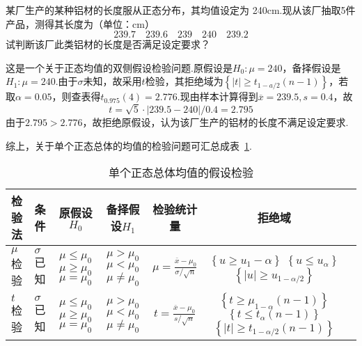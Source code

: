 \begin{example}\label{exam7.2.2}
	某厂生产的某种铝材的长度服从正态分布，其均值设定为 240cm.现从该厂抽取5件产品，测得其长度为（单位：cm）
	\[239.7 \quad 239.6 \quad 239 \quad 240 \quad 239.2\]
	试判断该厂此类铝材的长度是否满足设定要求？
	
	这是一个关于正态均值的双侧假设检验问题.原假设是$H_{0}:\mu =240$，备择假设是$H_{1}:\mu =240$.由于$\sigma$未知，故采用$t$检验，其拒绝域为$\left\{\left| t\right|\geq t_{1-a/2}\left(n-1\right)\right\}$，若取$\alpha=0.05$，则查表得$t_{0.975}(4)=2.776$.现由样本计算得到$\overline{ x }=239.5,s=0.4$，故
	\[t = \sqrt { 5 } \cdot | 239.5 - 240 | / 0.4 = 2.795\]
	由于$2.795>2.776$，故拒绝原假设，认为该厂生产的铝材的长度不满足设定要求.
	
	综上，关于单个正态总体的均值的检验问题可汇总成表~\ref{tab7.2.1}.
	\begin{table}[!ht]
		\centering
		\caption{单个正态总体均值的假设检验}\label{tab7.2.1}
\begin{tabularx}{\textwidth}{p{1.5cm}p{1.5cm}ccccc}
			\toprule
检验法&条件&原假设$H_{0}$&备择假设$H_{1}$&检验统计量&拒绝域\\
			\midrule
$\mu $检验&$\sigma$已知&\parbox{1.5cm}{$\mu \leq \mu _ { 0 }$\\$\mu \geq \mu _ { 0 }$\\$\mu = \mu _ { 0 }$}&\parbox{1.2cm}{$\mu > \mu _ { 0 }$\\$\mu < \mu _ { 0 }$\\$\mu \ne  \mu _ { 0 }$}&$\mu = \frac { \overline { x } - \mu _ { 0 } } { \sigma / \sqrt { n } }$&\parbox{1.2cm}{$\left\lbrace  u \geq u _ { 1 } - \alpha \right\rbrace $\\$\left\lbrace  u \leq u _ {\alpha} \right\rbrace $\\$\left\lbrace  |u| \geq u _ { 1- \alpha/ 2} \right\rbrace $}\\
$t $检验&$\sigma$已知&\parbox{1.5cm}{$\mu \leq \mu _ { 0 }$\\$\mu \geq \mu _ { 0 }$\\$\mu = \mu _ { 0 }$}&\parbox{1.2cm}{$\mu > \mu _ { 0 }$\\$\mu < \mu _ { 0 }$\\$\mu \ne  \mu _ { 0 }$}&$t = \frac { \overline { x } - \mu _ { 0 } } { s / \sqrt { n } }$&\parbox{1.2cm}{$\left\{t\geq\mu_{1-\alpha}\left(n-1\right)\right\} $\\$\left\{ t\leq t_{\alpha}\left(n-1\right)\right\} $\\$\left\{\left| t\right|\geq t_{1-\alpha/2}\left(n-1\right)\right\} $}\\
			\bottomrule
		\end{tabularx}
	\end{table}
\end{example}


